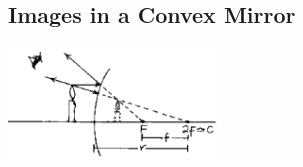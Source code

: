 \begin{multicols}{2}
%
%

\subsection{Images in a Convex Mirror}

\begin{center}
\includegraphics[width=0.42\textwidth]{./img/source/images-convex.png}
\end{center}


\end{multicols}
